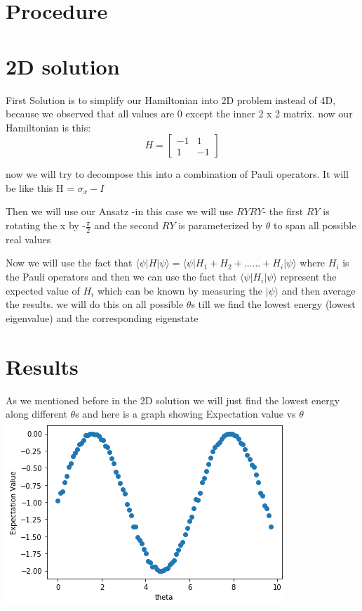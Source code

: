 \documentclass[11pt]{article}
\begin{document}
	\section*{Procedure}
	{\addtolength{\leftskip}{7mm}
		\section*{2D solution}
			{\addtolength{\leftskip}{7mm}
			First Solution is to simplify our Hamiltonian into 2D problem instead of 4D, because we observed that all values are 0 except the inner 2 x 2 matrix.
			now our Hamiltonian is this:
			\begin{equation*}
			H = 
			\begin{bmatrix}
			-1 & 1\\
			1 & -1
			\end{bmatrix}
			\end{equation*}
			
			now we will try to decompose this into a combination of Pauli operators. It will be like this H = $\sigma_{x} - I$
			
			Then we will use our Ansatz -in this case we will use $RYRY$- the first $RY$ is rotating the x by -$\frac{\pi}{2}$ and the second $RY$ is parameterized by $\theta$ to span all possible real values
			
			Now we will use the fact that $\langle \psi|H|\psi \rangle = \langle \psi|H_{1} + H_{2} + ...... + H_{i}|\psi \rangle$ where $H_{i}$ is the Pauli operators and then we can use the fact that $\langle \psi| H_{i} | \psi \rangle$ represent the expected value of $H_{i}$ which can be known by measuring the $|\psi \rangle$ and then average the results. we will do this on all possible $\theta$s  till we find the lowest energy (lowest eigenvalue) and the corresponding eigenstate
			
				
		}
	}


	\section*{Results}
	
	As we mentioned before in the 2D solution we will just find the lowest energy along different $\theta$s and here is a graph showing Expectation value vs $\theta$\\
	\includegraphics[scale=1]{../download}
	
\end{document}
